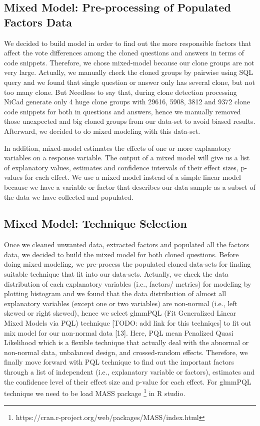 \documentclass[conference]{IEEEtran}
\begin{document}
\subsection{Mixed Model: Pre-processing of Populated Factors Data}
We decided to build model in order to find out the more responsible factors that affect the vote differences among the cloned questions and answers in terms of code snippets. Therefore, we chose mixed-model because our clone groups are not very large. Actually, we manually check the cloned groups by pairwise using SQL query and we found that single question or answer only has several clone, but not too many clone. But Needless to say that, during clone detection processing NiCad generate only 4 huge clone groups with 29616, 5908, 3812 and 9372 clone code snippets for both in questions and answers, hence  we manually removed those unexpected and big cloned groups from our data-set to avoid biased results. Afterward, we decided to do mixed modeling with this data-set.

In addition,  mixed-model estimates the effects of one or more explanatory variables on a response variable. The output of a mixed model will give us a list of explanatory values, estimates and confidence intervals of their effect sizes, p-values for each effect. We use a mixed model instead of a simple linear model because we have a variable or factor that describes our data sample as a subset of the data we have collected and populated.  

\subsection{Mixed Model: Technique Selection}
Once we cleaned unwanted data, extracted factors and populated all the factors data, we decided to build the mixed model for both cloned questions. Before doing mixed modeling, we pre-process the populated cloned  data-sets for finding suitable technique that fit into our data-sets. Actually, we check the data distribution of each explanatory variables (i.e., factors/ metrics) for modeling by plotting histogram and we found that the data distribution of almost all explanatory variables (except one or two variables) are non-normal (i.e., left skewed or right skewed), hence we select glmmPQL (Fit Generalized Linear Mixed Models via PQL) technique [TODO: add link for this techniqes] to fit out mix model for our non-normal data [13].  Here, PQL mean Penalized Quasi Likelihood which is a flexible technique that actually deal with the abnormal or non-normal data, unbalanced design, and crossed-random effects. Therefore, we finally move forward with PQL technique to find out the important factors through a list of independent (i.e., explanatory variable or factors), estimates and the confidence level of their effect size and p-value for each effect. For glmmPQL technique we need to be load MASS package \footnote{https://cran.r-project.org/web/packages/MASS/index.html} in R studio.
\end{document}
